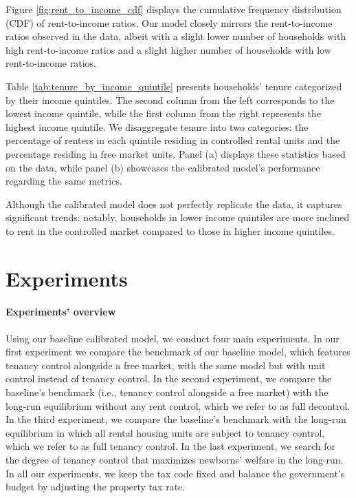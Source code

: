 \documentclass[parskip=full]{article}
\begin{document}
Figure \ref{fig:rent_to_income_cdf} displays the cumulative frequency distribution (CDF) of rent-to-income ratios. Our model closely mirrors the rent-to-income ratios observed in the data, albeit with a slight lower number of households with high rent-to-income ratios and a slight higher number of households with low rent-to-income ratios.

Table \ref{tab:tenure_by_income_quintile} presents households' tenure categorized by their income quintiles. The second column from the left corresponds to the lowest income quintile, while the first column from the right represents the highest income quintile. We disaggregate tenure into two categories: the percentage of renters in each quintile residing in controlled rental units and the percentage residing in free market units. Panel (a) displays these statistics based on the data, while panel (b) showcases the calibrated model's performance regarding the same metrics.

Although the calibrated model does not perfectly replicate the data, it captures significant trends: notably, households in lower income quintiles are more inclined to rent in the controlled market compared to those in higher income quintiles.

\section{Experiments}\label{section:experiments}

\paragraph{Experiments' overview} Using our baseline calibrated model, we conduct four main experiments. In our first experiment we compare the benchmark of our baseline model, which features tenancy control alongside a free market, with the same model but with unit control instead of tenancy control. In the second experiment, we compare the baseline's benchmark (i.e., tenancy control alongside a free market) with the long-run equilibrium without any rent control, which we refer to as full decontrol. In the third experiment, we compare the baseline's benchmark with the long-run equilibrium in which all rental housing units are subject to tenancy control, which we refer to as full tenancy control. In the last experiment, we search for the degree of tenancy control that maximizes newborns' welfare in the long-run. In all our experiments, we keep the tax code fixed and balance the government's budget by adjusting the property tax rate. 
\end{document}
